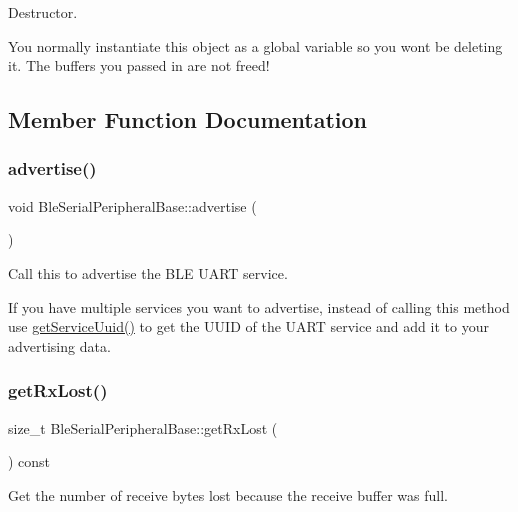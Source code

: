 Destructor. 

You normally instantiate this object as a global variable so you won\textquotesingle{}t be deleting it. The buffers you passed in are not freed! 

\subsection{Member Function Documentation}
\mbox{\label{class_ble_serial_peripheral_base_a870258aa62e285cc0e2717476ae51145}} 
\subsubsection{\texorpdfstring{advertise()}{advertise()}}
{\footnotesize\ttfamily void Ble\+Serial\+Peripheral\+Base\+::advertise (\begin{DoxyParamCaption}{ }\end{DoxyParamCaption})}



Call this to advertise the B\+LE U\+A\+RT service. 

If you have multiple services you want to advertise, instead of calling this method use \mbox{\hyperlink{class_ble_serial_peripheral_base_a0457f2495023d47468a2f5b1964c0233}{get\+Service\+Uuid()}} to get the U\+U\+ID of the U\+A\+RT service and add it to your advertising data. \mbox{\label{class_ble_serial_peripheral_base_a97cee829a39ff3a62e3108f05fba64d8}} 
\subsubsection{\texorpdfstring{get\+Rx\+Lost()}{getRxLost()}}
{\footnotesize\ttfamily size\+\_\+t Ble\+Serial\+Peripheral\+Base\+::get\+Rx\+Lost (\begin{DoxyParamCaption}{ }\end{DoxyParamCaption}) const\hspace{0.3cm}{\ttfamily [inline]}}

Get the number of receive bytes lost because the receive buffer was full.

